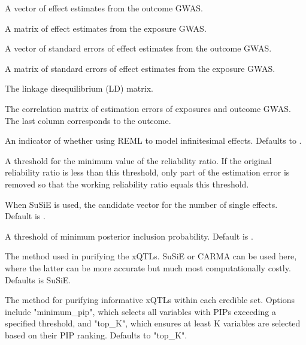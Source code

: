 \documentclass[a4paper]{book}
\begin{document}
\begin{Arguments}
\begin{ldescription}
\item[\code{by}] A vector of effect estimates from the outcome GWAS.

\item[\code{bX}] A matrix of effect estimates from the exposure GWAS.

\item[\code{byse}] A vector of standard errors of effect estimates from the outcome GWAS.

\item[\code{bXse}] A matrix of standard errors of effect estimates from the exposure GWAS.

\item[\code{LD}] The linkage disequilibrium (LD) matrix.

\item[\code{Rxy}] The correlation matrix of estimation errors of exposures and outcome GWAS. The last column corresponds to the outcome.

\item[\code{model.infinitesimal}] An indicator of whether using REML to model infinitesimal effects. Defaults to .

\item[\code{reliability.thres}] A threshold for the minimum value of the reliability ratio. If the original reliability ratio is less than this threshold, only part of the estimation error is removed so that the working reliability ratio equals this threshold.

\item[\code{Lvec}] When SuSiE is used, the candidate vector for the number of single effects. Default is .

\item[\code{causal.pip.thres}] A threshold of minimum posterior inclusion probability. Default is .

\item[\code{xQTL.method}] The method used in purifying the xQTLs. SuSiE or CARMA can be used here, where the latter can be more accurate but much most computationally costly. Defaults is SuSiE.

\item[\code{xQTL.selection.rule}] The method for purifying informative xQTLs within each credible set. Options include "minimum\_pip", which selects all variables with PIPs exceeding a specified threshold, and "top\_K", which ensures at least K variables are selected based on their PIP ranking. Defaults to "top\_K".


\end{ldescription}
\end{Arguments}
\end{document}
